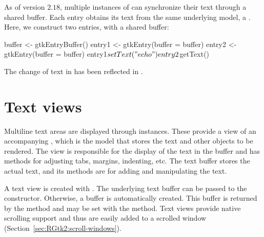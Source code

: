 As of \GTK\/ version $2.18$, multiple instances of 
can synchronize their text through a shared buffer. Each entry obtains
its text from the same underlying model, a
. Here, we construct two entries, with a shared
buffer:
\begin{Schunk}
\begin{Sinput}
 buffer <- gtkEntryBuffer()        
 entry1 <- gtkEntry(buffer = buffer)
 entry2 <- gtkEntry(buffer = buffer)
 entry1$setText("echo")
 entry2$getText()
\end{Sinput}
\end{Schunk}
%
The change of text in  has been reflected in
.

\section{Text views} %
\label{sec:RGtk2:textviews}

Multiline text areas are displayed through 
instances. These provide a view of an accompanying
, which is the model that stores the text and
other objects to be rendered. The view is responsible for the display
of the text in the buffer and has methods for adjusting tabs, margins,
indenting, etc. The text buffer stores the actual text, and its
methods are for adding and manipulating the text.

A text view is created with .  The underlying
text buffer can be passed to the constructor. Otherwise, a buffer is
automatically created.  This buffer is returned by the method
 and may be set with the
 method. Text views provide native
scrolling support and thus are easily added to a scrolled window
(Section~\ref{sec:RGtk2:scroll-windows}). 

